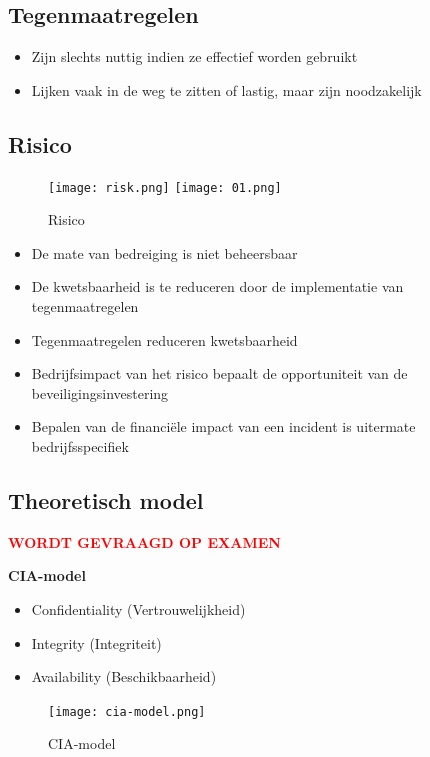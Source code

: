 \documentclass{article}
\newcommand{\bold}[1]{\textbf{#1}}
\begin{document}
\subsection{Tegenmaatregelen}
\begin{itemize}
    \item Zijn slechts nuttig indien ze effectief worden gebruikt
    \item Lijken vaak in de weg te zitten of lastig, maar zijn noodzakelijk
\end{itemize}

\subsection{Risico}

\begin{figure}[H]
    \centering
    \texttt{[image: risk.png]}
    \texttt{[image: 01.png]}
    \caption{Risico}
\end{figure}


\begin{itemize}
    \item De mate van bedreiging is niet beheersbaar
    \item De kwetsbaarheid is te reduceren door de implementatie van tegenmaatregelen
    \item Tegenmaatregelen reduceren kwetsbaarheid
    \item Bedrijfsimpact van het risico bepaalt de opportuniteit van de beveiligingsinvestering
    \item Bepalen van de financiële impact van een incident is uitermate bedrijfsspecifiek
\end{itemize}




\subsection{Theoretisch model}
\textcolor{red}{\bold{WORDT GEVRAAGD OP EXAMEN}}

\bold{CIA-model}

\begin{itemize}
    \item Confidentiality (Vertrouwelijkheid)
    \item Integrity (Integriteit)
    \item Availability (Beschikbaarheid)
\end{itemize}

\begin{figure}[H]
    \centering
    \texttt{[image: cia-model.png]}
    \caption{CIA-model}
\end{figure}
\end{document}
